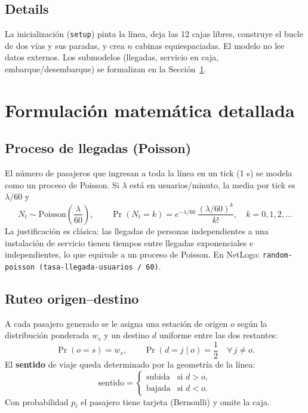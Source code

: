 \documentclass[11pt,a4paper]{article}
\newcommand{\code}[1]{\texttt{#1}}
\begin{document}
\subsection{Details}
La inicialización (\code{setup}) pinta la línea, deja las 12 cajas libres, construye
el bucle de dos vías y sus paradas, y crea $n$ cabinas equiespaciadas. El modelo no
lee datos externos. Los submodelos (llegadas, servicio en caja, embarque/desembarque)
se formalizan en la Sección~\ref{sec:mat}.

\section{Formulación matemática detallada}
\label{sec:mat}

\subsection{Proceso de llegadas (Poisson)}
El número de pasajeros que ingresan a toda la línea en un tick (1 s) se modela como
un proceso de Poisson. Si $\lambda$ está en usuarios/minuto, la media por tick es
$\lambda/60$ y
\begin{equation}
N_t \sim \mathrm{Poisson}\!\left(\frac{\lambda}{60}\right),\qquad
\Pr(N_t = k) = e^{-\lambda/60}\,\frac{(\lambda/60)^k}{k!},\quad k=0,1,2,\dots
\end{equation}
La justificación es clásica: las llegadas de personas independientes a una
instalación de servicio tienen tiempos entre llegadas exponenciales e
independientes, lo que equivale a un proceso de Poisson. En NetLogo:
\code{random-poisson (tasa-llegada-usuarios / 60)}.

\subsection{Ruteo origen--destino}
A cada pasajero generado se le asigna una estación de origen $o$ según la
distribución ponderada $w_s$ y un destino $d$ uniforme entre las dos restantes:
\begin{equation}
\Pr(o = s) = w_s,\qquad
\Pr(d = j \mid o) = \frac{1}{2}\quad \forall\, j \neq o .
\end{equation}
El \textbf{sentido} de viaje queda determinado por la geometría de la línea:
\begin{equation}
\text{sentido} =
\begin{cases}
\text{subida} & \text{si } d > o,\\[2pt]
\text{bajada} & \text{si } d < o.
\end{cases}
\end{equation}
Con probabilidad $p_t$ el pasajero tiene tarjeta (Bernoulli) y omite la caja.
\end{document}
